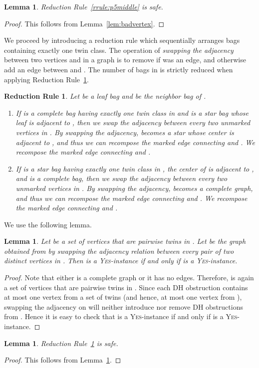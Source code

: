 \documentclass[11pt]{elsarticle}
\newtheorem{lemma}[theorem]{Lemma}
\newtheorem{RRULE}{Reduction Rule}
\newcommand{\YES}{\textsc{Yes}}
\begin{document}
\begin{lemma}
  \label{lem:p5middle}
Reduction Rule~\ref{rrule:p5middle} is safe.
\end{lemma}
\begin{proof}
This follows from Lemma~\ref{lem:badvertex}.
\end{proof}



We proceed by introducing a reduction rule which sequentially arranges bags containing exactly one twin class.
The operation of \emph{swapping the adjacency} between two vertices  and  in a graph is to remove  if  was an edge, and otherwise add an edge between  and .
The number of bags in  is strictly reduced when applying Reduction Rule~\ref{rrule:leaf}.

\begin{RRULE}\label{rrule:leaf}
Let  be a leaf bag and  be the neighbor bag of .
\begin{enumerate}[(1)]
\item If  is a complete bag having exactly one twin class in  and  is a star bag whose leaf is adjacent to , 
then we swap the adjacency between every two unmarked vertices in . By swapping the adjacency,  becomes a star whose center is adjacent to , and thus we can recompose the marked edge connecting  and .
We recompose the marked edge connecting  and .
\item If  is a star bag having exactly one twin class in , the center of  is adjacent to , and  is a complete bag,  
then we swap the adjacency between every two unmarked vertices in . By swapping the adjacency,  becomes a complete graph, and thus we can recompose the marked edge connecting  and .
We recompose the marked edge connecting  and .
\end{enumerate}
\end{RRULE}

We use the following lemma.
\begin{lemma}\label{lem:swaptwinproperty}
Let  be a set of vertices that are pairwise twins in . Let  be the graph obtained from  by swapping the adjacency relation between every pair of two distinct vertices in .
Then  is a \YES-instance if and only if  is a \YES-instance.
\end{lemma}
\begin{proof}
Note that either  is a complete graph or it has no edges. Therefore,  is again a set of vertices that are pairwise twins in .
Since each DH obstruction contains at most one vertex from a set of twins (and hence, at most one vertex from ), swapping the adjacency on  will neither introduce nor remove DH obstructions from .
Hence it is easy to check that   is a \YES-instance if and only if  is a \YES-instance.
\end{proof}
\begin{lemma}
Reduction Rule~\ref{rrule:leaf} is safe.
\end{lemma}
\begin{proof}
This follows from Lemma~\ref{lem:swaptwinproperty}.
\end{proof}
\end{document}
